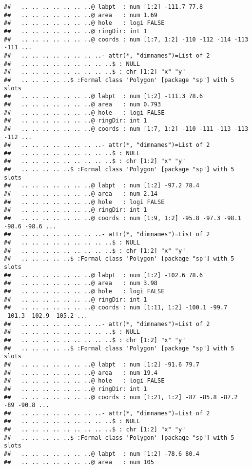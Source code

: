 \documentclass[]{article}
\begin{document}
\begin{verbatim}
##   .. .. .. .. .. .. ..@ labpt  : num [1:2] -111.7 77.8
##   .. .. .. .. .. .. ..@ area   : num 1.69
##   .. .. .. .. .. .. ..@ hole   : logi FALSE
##   .. .. .. .. .. .. ..@ ringDir: int 1
##   .. .. .. .. .. .. ..@ coords : num [1:7, 1:2] -110 -112 -114 -113 -111 ...
##   .. .. .. .. .. .. .. ..- attr(*, "dimnames")=List of 2
##   .. .. .. .. .. .. .. .. ..$ : NULL
##   .. .. .. .. .. .. .. .. ..$ : chr [1:2] "x" "y"
##   .. .. .. .. ..$ :Formal class 'Polygon' [package "sp"] with 5 slots
##   .. .. .. .. .. .. ..@ labpt  : num [1:2] -111.3 78.6
##   .. .. .. .. .. .. ..@ area   : num 0.793
##   .. .. .. .. .. .. ..@ hole   : logi FALSE
##   .. .. .. .. .. .. ..@ ringDir: int 1
##   .. .. .. .. .. .. ..@ coords : num [1:7, 1:2] -110 -111 -113 -113 -112 ...
##   .. .. .. .. .. .. .. ..- attr(*, "dimnames")=List of 2
##   .. .. .. .. .. .. .. .. ..$ : NULL
##   .. .. .. .. .. .. .. .. ..$ : chr [1:2] "x" "y"
##   .. .. .. .. ..$ :Formal class 'Polygon' [package "sp"] with 5 slots
##   .. .. .. .. .. .. ..@ labpt  : num [1:2] -97.2 78.4
##   .. .. .. .. .. .. ..@ area   : num 2.14
##   .. .. .. .. .. .. ..@ hole   : logi FALSE
##   .. .. .. .. .. .. ..@ ringDir: int 1
##   .. .. .. .. .. .. ..@ coords : num [1:9, 1:2] -95.8 -97.3 -98.1 -98.6 -98.6 ...
##   .. .. .. .. .. .. .. ..- attr(*, "dimnames")=List of 2
##   .. .. .. .. .. .. .. .. ..$ : NULL
##   .. .. .. .. .. .. .. .. ..$ : chr [1:2] "x" "y"
##   .. .. .. .. ..$ :Formal class 'Polygon' [package "sp"] with 5 slots
##   .. .. .. .. .. .. ..@ labpt  : num [1:2] -102.6 78.6
##   .. .. .. .. .. .. ..@ area   : num 3.98
##   .. .. .. .. .. .. ..@ hole   : logi FALSE
##   .. .. .. .. .. .. ..@ ringDir: int 1
##   .. .. .. .. .. .. ..@ coords : num [1:11, 1:2] -100.1 -99.7 -101.3 -102.9 -105.2 ...
##   .. .. .. .. .. .. .. ..- attr(*, "dimnames")=List of 2
##   .. .. .. .. .. .. .. .. ..$ : NULL
##   .. .. .. .. .. .. .. .. ..$ : chr [1:2] "x" "y"
##   .. .. .. .. ..$ :Formal class 'Polygon' [package "sp"] with 5 slots
##   .. .. .. .. .. .. ..@ labpt  : num [1:2] -91.6 79.7
##   .. .. .. .. .. .. ..@ area   : num 19.4
##   .. .. .. .. .. .. ..@ hole   : logi FALSE
##   .. .. .. .. .. .. ..@ ringDir: int 1
##   .. .. .. .. .. .. ..@ coords : num [1:21, 1:2] -87 -85.8 -87.2 -89 -90.8 ...
##   .. .. .. .. .. .. .. ..- attr(*, "dimnames")=List of 2
##   .. .. .. .. .. .. .. .. ..$ : NULL
##   .. .. .. .. .. .. .. .. ..$ : chr [1:2] "x" "y"
##   .. .. .. .. ..$ :Formal class 'Polygon' [package "sp"] with 5 slots
##   .. .. .. .. .. .. ..@ labpt  : num [1:2] -78.6 80.4
##   .. .. .. .. .. .. ..@ area   : num 105

\end{verbatim}
\end{document}
